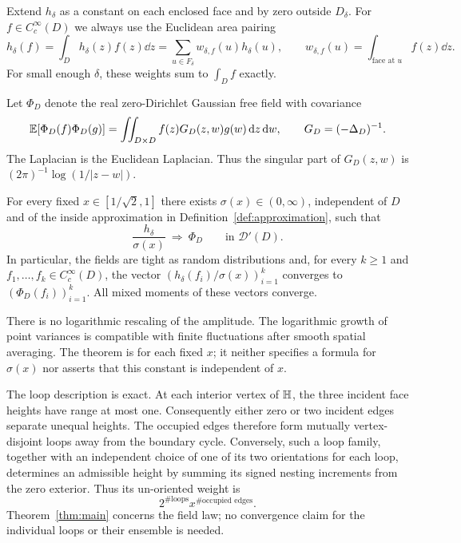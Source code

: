 Extend $h_\delta$ as a constant on each enclosed face and by zero outside
$D_\delta$.  For $f\in C_c^\infty(D)$ we always use the Euclidean area
pairing
\begin{equation}\label{eq:area-pairing}
 h_\delta(f)=\int_D h_\delta(z)f(z)\dd z
 =\sum_{u\in F_\delta} w_{\delta,f}(u)h_\delta(u),
 \qquad w_{\delta,f}(u)=\int_{\text{face at }u}f(z)\dd z.
\end{equation}
For small enough $\delta$, these weights sum to $\int_D f$ exactly.

Let $\Phi_D$ denote the real zero-Dirichlet Gaussian free field with
covariance
\begin{equation}\label{eq:gff-covariance}
 \mathbb E[\Phi_D(f)\Phi_D(g)]
 =\iint_{D\times D} f(z)G_D(z,w)g(w)\,\mathrm d z\,\mathrm d w,
 \qquad G_D=(-\Delta_D)^{-1}.
\end{equation}
The Laplacian is the Euclidean Laplacian.  Thus the singular part of
$G_D(z,w)$ is $(2\pi)^{-1}\log(1/|z-w|)$.

\begin{theorem}\label{thm:main}
For every fixed $x\in[1/\sqrt2,1]$ there exists
$\sigma(x)\in(0,\infty)$, independent of $D$ and of the inside approximation
in Definition~\ref{def:approximation}, such that
\[
 \frac{h_\delta}{\sigma(x)}\ \Longrightarrow\ \Phi_D
 \qquad\text{in }\mathcal D'(D).
\]
In particular, the fields are tight as random distributions and, for every
$k\ge1$ and $f_1,\ldots,f_k\in C_c^\infty(D)$, the vector
$(h_\delta(f_i)/\sigma(x))_{i=1}^k$ converges to
$(\Phi_D(f_i))_{i=1}^k$.  All mixed moments of these vectors converge.
\end{theorem}

There is no logarithmic rescaling of the amplitude.  The logarithmic growth
of point variances \cite[Section~1.2.4]{GL2025} is compatible with finite fluctuations after smooth
spatial averaging.  The theorem is for each fixed $x$; it neither specifies
a formula for $\sigma(x)$ nor asserts that this constant is independent of
$x$.

The loop description is exact.  At each interior vertex of $\mathbb H$, the
three incident face heights have range at most one.  Consequently either
zero or two incident edges separate unequal heights.  The occupied edges
therefore form mutually vertex-disjoint loops away from the boundary
cycle.  Conversely, such a loop family, together with an independent
choice of one of its two orientations for each loop, determines an
admissible height by summing its signed nesting increments from the zero
exterior.  Thus its un-oriented weight is
\begin{equation}\label{eq:loop-weight}
 2^{\#\text{loops}}x^{\#\text{occupied edges}}.
\end{equation}
Theorem~\ref{thm:main} concerns the field law; no convergence claim for the
individual loops or their ensemble is needed.

